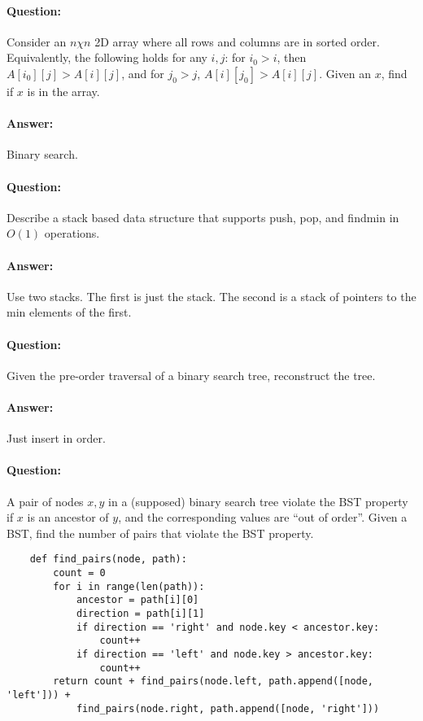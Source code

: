 \documentclass{article}
\begin{document}
\paragraph{Question:} Consider an \(n \chi n\) 2D array where all rows and columns are in sorted order. Equivalently, the following holds for any \(i, j\): for \(i_0 > i\), then \(A[i_0][j] > A[i][j]\), and for \(j_0 > j\), \(A[i][j_0] > A[i][j]\). Given an \(x\), find if \(x\) is in the array.

\paragraph{Answer:} Binary search.

\paragraph{Question:} Describe a stack based data structure that supports push, pop, and findmin in \(O(1)\) operations.

\paragraph{Answer:} Use two stacks. The first is just the stack. The second is a stack of pointers to the min elements of the first.

\paragraph{Question:} Given the pre-order traversal of a binary search tree, reconstruct the tree.

\paragraph{Answer:} Just insert in order.

\paragraph{Question:} A pair of nodes \(x, y\) in a (supposed) binary search tree violate the BST property if \(x\) is an ancestor of \(y\), and the corresponding values are “out of order”. Given a BST, find the number of pairs that violate the BST property.

\begin{lstlisting}
    def find_pairs(node, path):
        count = 0
        for i in range(len(path)):
            ancestor = path[i][0]
            direction = path[i][1]
            if direction == 'right' and node.key < ancestor.key:
                count++
            if direction == 'left' and node.key > ancestor.key:
                count++
        return count + find_pairs(node.left, path.append([node, 'left'])) + 
            find_pairs(node.right, path.append([node, 'right']))
    \end{lstlisting}
\end{document}
